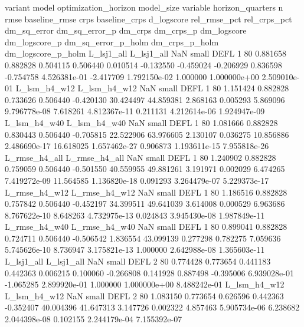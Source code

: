       variant         model  optimization_horizon model_size variable  horizon_quarters  n     rmse  baseline_rmse     crps  baseline_crps  d_logscore  rel_rmse_pct  rel_crps_pct  dm_sq_error  dm_sq_error_p   dm_crps    dm_crps_p  dm_logscore  dm_logscore_p  dm_sq_error_p_holm  dm_crps_p_holm  dm_logscore_p_holm
   L_lsj1_all    L_lsj1_all                   NaN      small     DEFL                 1 80 0.881658       0.882828 0.504115       0.506440    0.010514     -0.132550     -0.459024    -0.206929       0.836598 -0.754758 4.526381e-01    -2.417709   1.792150e-02            1.000000    1.000000e+00        2.509010e-01
 L_lsm_h4_w12  L_lsm_h4_w12                   NaN      small     DEFL                 1 80 1.151424       0.882828 0.733626       0.506440   -0.420130     30.424497     44.859381     2.868163       0.005293  5.869096 9.796778e-08     7.618261   4.812367e-11            0.211131    4.212614e-06        1.924947e-09
 L_lsm_h4_w40  L_lsm_h4_w40                   NaN      small     DEFL                 1 80 1.081666       0.882828 0.830443       0.506440   -0.705815     22.522906     63.976605     2.130107       0.036275 10.856886 2.486690e-17    16.618025   1.657462e-27            0.906873    1.193611e-15        7.955818e-26
L_rmse_h4_all L_rmse_h4_all                   NaN      small     DEFL                 1 80 1.240902       0.882828 0.759059       0.506440   -0.501550     40.559955     49.881261     3.191971       0.002029  6.474265 7.419272e-09    11.564585   1.136820e-18            0.091293    3.264479e-07        5.229373e-17
L_rmse_h4_w12 L_rmse_h4_w12                   NaN      small     DEFL                 1 80 1.186516       0.882828 0.757842       0.506440   -0.452197     34.399511     49.641039     3.614008       0.000529  6.963686 8.767622e-10     8.648263   4.732975e-13            0.024843    3.945430e-08        1.987849e-11
L_rmse_h4_w40 L_rmse_h4_w40                   NaN      small     DEFL                 1 80 0.899041       0.882828 0.724711       0.506440   -0.506542      1.836554     43.099139     0.277298       0.782275  7.059636 5.745626e-10     8.736947   3.175821e-13            1.000000    2.642988e-08        1.365603e-11
   L_lsj1_all    L_lsj1_all                   NaN      small     DEFL                 2 80 0.774428       0.773654 0.441183       0.442363    0.006215      0.100060     -0.266808     0.141928       0.887498 -0.395006 6.939028e-01    -1.065285   2.899920e-01            1.000000    1.000000e+00        8.488242e-01
 L_lsm_h4_w12  L_lsm_h4_w12                   NaN      small     DEFL                 2 80 1.083150       0.773654 0.626596       0.442363   -0.352407     40.004396     41.647313     3.147726       0.002322  4.857463 5.905734e-06     6.238682   2.044398e-08            0.102155    2.244179e-04        7.155392e-07
